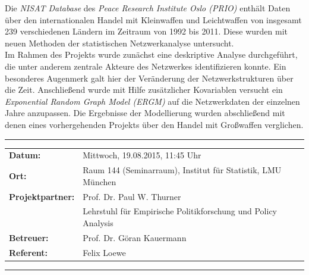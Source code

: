 \documentclass{article}
\begin{document}
\noindent
Die \emph{NISAT Database} des \emph{Peace Research Institute Oslo (PRIO)} enthält Daten über den internationalen Handel mit Kleinwaffen und Leichtwaffen von insgesamt 239 verschiedenen Ländern im Zeitraum von 1992 bis 2011. Diese wurden mit neuen Methoden der statistischen Netzwerkanalyse untersucht.\\

\noindent
Im Rahmen des Projekts wurde zunächst eine deskriptive Analyse durchgeführt, die unter anderem zentrale Akteure des Netzwerkes identifizieren konnte. Ein besonderes Augenmerk galt hier der Veränderung der Netzwerkstrukturen über die Zeit. Anschließend wurde mit Hilfe zusätzlicher Kovariablen versucht ein \emph{Exponential Random Graph Model (ERGM)} auf die Netzwerkdaten der einzelnen Jahre anzupassen. Die Ergebnisse der Modellierung wurden abschließend mit denen eines vorhergehenden Projekts über den Handel mit Großwaffen verglichen.
\vspace{1.5cm}
\hrule 
\begin{table}[h]
 \renewcommand{\arraystretch}{1.5}
\begin{tabular}{ll}
\textbf{Datum:} & Mittwoch, 19.08.2015, 11:45 Uhr \\
\textbf{Ort:} &  Raum 144 (Seminarraum), Institut f\"ur Statistik, LMU M\"unchen\\
\textbf{Projektpartner:} & Prof. Dr. Paul W. Thurner\\
&Lehrstuhl für Empirische Politikforschung und Policy Analysis\\
\textbf{Betreuer:} & Prof. Dr. Göran Kauermann \\
\textbf{Referent:} & Felix Loewe\\
\end{tabular}
\end{table}
\hrule
\end{document}
